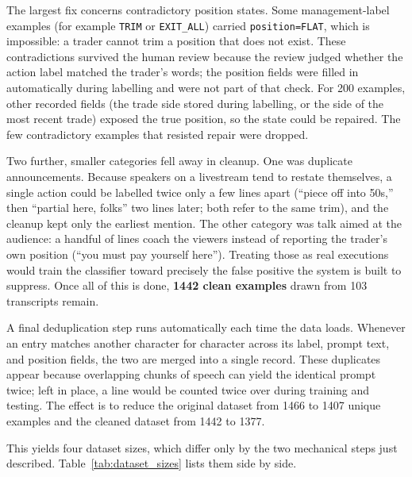 The largest fix concerns contradictory position states. Some management-label examples (for example \texttt{TRIM} or \texttt{EXIT\_ALL}) carried \texttt{position=FLAT}, which is impossible: a trader cannot trim a position that does not exist. These contradictions survived the human review because the review judged whether the action label matched the trader's words; the position fields were filled in automatically during labelling and were not part of that check. For 200 examples, other recorded fields (the trade side stored during labelling, or the side of the most recent trade) exposed the true position, so the state could be repaired. The few contradictory examples that resisted repair were dropped.

Two further, smaller categories fell away in cleanup. One was duplicate announcements. Because speakers on a livestream tend to restate themselves, a single action could be labelled twice only a few lines apart (``piece off into 50s,'' then ``partial here, folks'' two lines later; both refer to the same trim), and the cleanup kept only the earliest mention. The other category was talk aimed at the audience: a handful of lines coach the viewers instead of reporting the trader's own position (``you must pay yourself here''). Treating those as real executions would train the classifier toward precisely the false positive the system is built to suppress. Once all of this is done, \textbf{1442 clean examples} drawn from 103 transcripts remain.

A final deduplication step runs automatically each time the data loads. Whenever an entry matches another character for character across its label, prompt text, and position fields, the two are merged into a single record. These duplicates appear because overlapping chunks of speech can yield the identical prompt twice; left in place, a line would be counted twice over during training and testing. The effect is to reduce the original dataset from 1466 to 1407 unique examples and the cleaned dataset from 1442 to 1377.

This yields four dataset sizes, which differ only by the two mechanical steps just described. Table~\ref{tab:dataset_sizes} lists them side by side.

